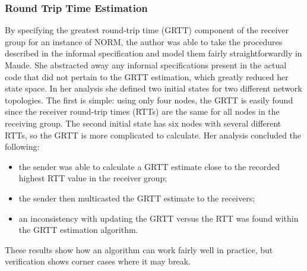 \documentclass[10pt, journal]{IEEEtran}
\begin{document}
\subsubsection{Round Trip Time Estimation}
By specifying the greatest round-trip time (GRTT) component of the receiver group for an instance of NORM, the author was able to take the procedures described in the informal specification and model them fairly straightforwardly in Maude. She abstracted away any informal specifications present in the actual code that did not pertain to the GRTT estimation, which greatly reduced her state space.
\bigbreak
In her analysis she defined two initial states for two different network topologies. The first is simple: using only four nodes, the GRTT is easily found since the receiver round-trip times (RTTs) are the same for all nodes in the receiving group. The second initial state has six nodes with several different RTTs, so the GRTT is more complicated to calculate. Her analysis concluded the following: \begin{itemize}
	\item the sender was able to calculate a GRTT estimate close to the recorded highest RTT value in the receiver group;
	\item the sender then multicasted the GRTT estimate to the receivers;
	\item an inconsistency with updating the GRTT versus the RTT was found within the GRTT estimation algorithm.
\end{itemize}
These results show how an algorithm can work fairly well in practice, but verification shows corner cases where it may break.
\bigbreak
\end{document}
